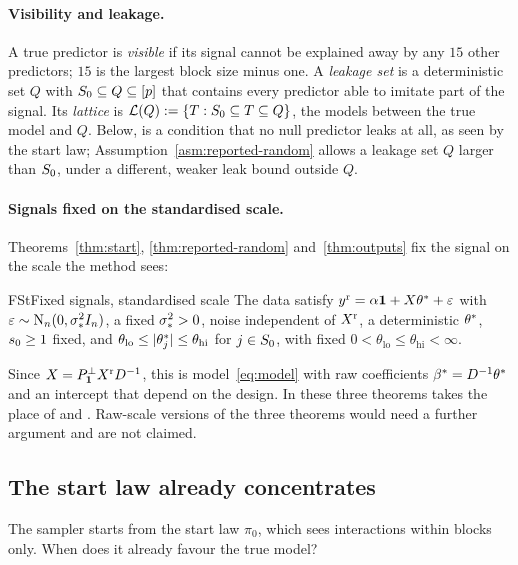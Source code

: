 \paragraph{Visibility and leakage.} A true predictor is \emph{visible} if its signal cannot be explained away by any $15$
other predictors; $15$ is the largest block size minus one. A \emph{leakage set} is a deterministic set $Q$ with
$S_0\subseteq Q\subseteq[p]$ that contains every predictor able to imitate part of the signal. Its \emph{lattice} is
$\mathcal L(Q):=\{T:S_0\subseteq T\subseteq Q\}$, the models between the true model and $Q$. Below,  is a condition that no null predictor leaks at all, as seen by
the start law; Assumption~\ref{asm:reported-random} allows a leakage set $Q$ larger than $S_0$, under a different, weaker
leak bound outside $Q$.

\paragraph{Signals fixed on the standardised scale.} Theorems~\ref{thm:start}, \ref{thm:reported-random}
and~\ref{thm:outputs} fix the signal on the scale the method sees:

\begin{assumption}{FSt}{Fixed signals, standardised scale}
The data satisfy $y^{\mathrm r}=\alpha\mathbf{1}+X\theta^*+\varepsilon$ with $\varepsilon\sim\mathrm{N}_n(0,\sigma_*^2I_n)$, a fixed
$\sigma_*^2>0$, noise independent of $X^{\mathrm r}$, a deterministic $\theta^*$, $s_0\ge1$ fixed, and $\theta_{\mathrm{lo}}\le\lvert \theta^*_j\rvert\le\theta_{\mathrm{hi}}$ for
$j\in S_0$, with fixed $0<\theta_{\mathrm{lo}}\le\theta_{\mathrm{hi}}<\infty$.
\end{assumption}

Since $X=P^\perp_{\mathbf{1}}X^{\mathrm r} D^{-1}$, this is model~\eqref{eq:model} with raw coefficients $\beta^*=D^{-1}\theta^*$ and an
intercept that depend on the design. In these three theorems  takes the place of  and . Raw-scale
versions of the three theorems would need a further argument and are not claimed.

\subsection{The start law already concentrates}\label{sec:start}

The sampler starts from the start law $\pi_0$, which sees interactions within blocks only. When does it already favour
the true model?

